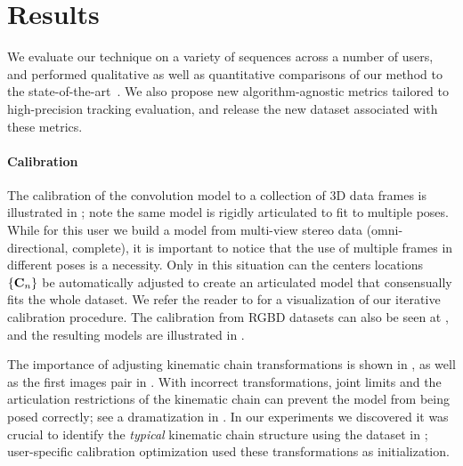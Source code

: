 \section{Results}
\label{sec:results}
We evaluate our technique on a variety of sequences across a number of users, 
and performed qualitative as well as quantitative  
comparisons of our method to the state-of-the-art~\cite{qian2014realtime,sridhar2015fast,tagliasacchi2015robust,sharp2015accurate,taylor2016concerto}. We also propose new algorithm-agnostic metrics tailored to high-precision tracking evaluation, and release the new \handy{} dataset associated with these metrics.

\paragraph{Calibration}
The calibration of the convolution model to a collection of 3D data frames is illustrated in ; note the same model is rigidly articulated to fit to multiple poses. While for this user we build a model from multi-view stereo data (omni-directional, complete), it is important to notice that the use of multiple frames in different poses is a necessity. Only in this situation can the centers locations ${\{\mathbf{C}_n\}}$ be automatically adjusted to create an articulated model that consensually fits the whole dataset. We refer the reader to \VideoMVS{} for a visualization of our iterative calibration procedure. The calibration from RGBD datasets can also be seen at \VideoCalibRGB{}, and the resulting models are illustrated in . 

The importance of adjusting kinematic chain transformations is shown in , as well as the first images pair in . With incorrect  transformations, joint limits and the articulation restrictions of the kinematic chain can prevent the model from being posed correctly; see a dramatization in \VideoKinematic{}. In our experiments we discovered it was crucial to identify the \emph{typical} kinematic chain structure using the dataset in ; user-specific calibration optimization used these transformations as initialization.

